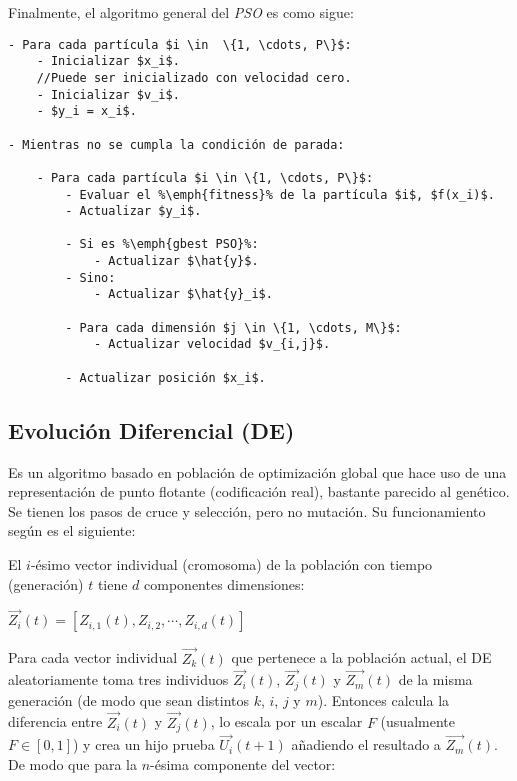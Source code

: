     Finalmente, el algoritmo general del \emph{PSO} es como sigue\cite{PSO_0}:
\begin{lstlisting}[float=h, caption=Algoritmo General PSO]
- Para cada partícula $i \in  \{1, \cdots, P\}$:
    - Inicializar $x_i$.
    //Puede ser inicializado con velocidad cero.
    - Inicializar $v_i$.
    - $y_i = x_i$.

- Mientras no se cumpla la condición de parada:

    - Para cada partícula $i \in \{1, \cdots, P\}$:
        - Evaluar el %\emph{fitness}% de la partícula $i$, $f(x_i)$.
        - Actualizar $y_i$.

        - Si es %\emph{gbest PSO}%:
            - Actualizar $\hat{y}$.
        - Sino:
            - Actualizar $\hat{y}_i$.

        - Para cada dimensión $j \in \{1, \cdots, M\}$:
            - Actualizar velocidad $v_{i,j}$.

        - Actualizar posición $x_i$.
\end{lstlisting}

\subsection{Evolución Diferencial (DE)} \label{sect:metade}

Es un algoritmo basado en poblaci\'on de
optimizaci\'on global que hace uso de una representaci\'on de punto flotante
(codificaci\'on real), bastante parecido al gen\'etico. Se tienen los pasos de cruce 
y selecci\'on, pero no mutaci\'on. Su funcionamiento seg\'un \cite{SwAjAm2008}
es el siguiente:

El $i$-\'esimo vector individual (cromosoma)
de la poblaci\'on con tiempo (generaci\'on) $t$ tiene $d$ componentes
dimensiones:

\begin{center}
$ \overrightarrow{Z_i}(t) = [ Z_{i,1}(t), Z_{i,2}, \cdots, Z_{i,d}(t) ] $
\end{center}

Para cada vector individual $\overrightarrow{Z_k}(t)$ que pertenece
a la poblaci\'on actual, el DE aleatoriamente toma tres individuos
$\overrightarrow{Z_i}(t)$, $\overrightarrow{Z_j}(t)$ y $\overrightarrow{Z_m}(t)$ de la misma generaci\'on (de modo que sean distintos $k$, 
$i$, $j$ y $m$). Entonces calcula la diferencia entre $\overrightarrow{Z_i}(t)$ y $\overrightarrow{Z_j}(t)$, lo escala por un escalar $F$
(usualmente $F \in [0, 1]$) y crea un hijo prueba $\overrightarrow{U_i}(t + 1)$ a\~nadiendo el resultado a $\overrightarrow{Z_m}(t)$. De modo
que para la $n$-\'esima componente del vector:

